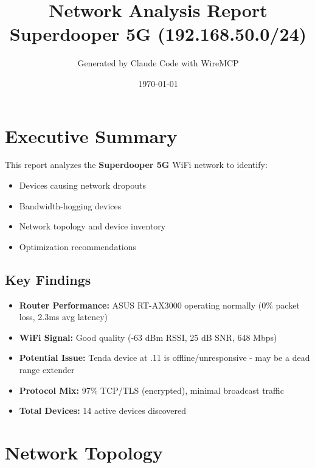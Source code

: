 \documentclass[11pt,letterpaper]{article}
\title{\textbf{Network Analysis Report}\\[0.5em]\large Superdooper 5G (192.168.50.0/24)}
\author{Generated by Claude Code with WireMCP}
\date{\today}
\begin{document}
\maketitle
\tableofcontents
\newpage

\section{Executive Summary}

This report analyzes the \textbf{Superdooper 5G} WiFi network to identify:
\begin{itemize}
    \item Devices causing network dropouts
    \item Bandwidth-hogging devices
    \item Network topology and device inventory
    \item Optimization recommendations
\end{itemize}

\subsection{Key Findings}

\begin{itemize}
    \item \textcolor{goodcolor}{\textbf{Router Performance:}} ASUS RT-AX3000 operating normally (0\% packet loss, 2.3ms avg latency)
    \item \textcolor{goodcolor}{\textbf{WiFi Signal:}} Good quality (-63 dBm RSSI, 25 dB SNR, 648 Mbps)
    \item \textcolor{warningcolor}{\textbf{Potential Issue:}} Tenda device at .11 is offline/unresponsive - may be a dead range extender
    \item \textcolor{goodcolor}{\textbf{Protocol Mix:}} 97\% TCP/TLS (encrypted), minimal broadcast traffic
    \item \textbf{Total Devices:} 14 active devices discovered
\end{itemize}

\section{Network Topology}
\end{document}
